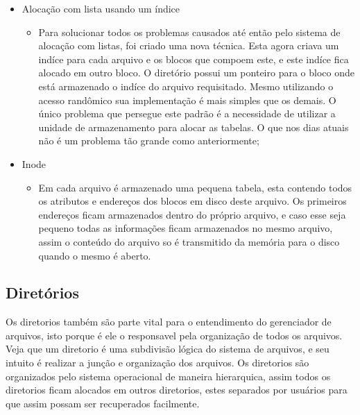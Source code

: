 \documentclass{article}
\begin{document}
\begin{itemize}
\item Alocação com lista usando um índice

	\begin{itemize}
		\item Para solucionar todos os problemas causados até então pelo sistema de alocação com listas, foi criado uma nova técnica. Esta agora criava um indíce para cada arquivo e os blocos que compoem este, e este indíce fica alocado em outro bloco. O diretório possui um ponteiro para o bloco onde está armazenado o indíce do arquivo requisitado. Mesmo utilizando o acesso randômico sua implementação é mais simples que os demais. O único problema que persegue este padrão é a necessidade de utilizar a unidade de armazenamento para alocar as tabelas. O que nos dias atuais não é um problema tão grande como anteriormente;

	\end{itemize}


\item Inode

	\begin{itemize}
		\item Em cada arquivo é armazenado uma pequena tabela, esta contendo todos os atributos e endereços dos blocos em disco deste arquivo. Os primeiros endereços ficam armazenados dentro do próprio arquivo, e caso esse seja pequeno todas as informações ficam armazenados no mesmo arquivo, assim o conteúdo do arquivo so é transmitido da memória para o disco quando o mesmo é aberto.
	\end{itemize}



\end{itemize}


\subsection{Diretórios}

Os diretorios também são parte vital para o entendimento do gerenciador de arquivos, isto porque é ele o responsavel pela organização de todos os arquivos. Veja que um diretorio é uma subdivisão lógica do sistema de arquivos, e seu intuito é  realizar a junção e organização dos arquivos.
Os diretorios são organizados pelo sistema operacional de maneira hierarquica, assim todos os diretorios ficam alocados em outros diretorios, estes separados por usuários para que assim possam ser recuperados facilmente.
\end{document}
